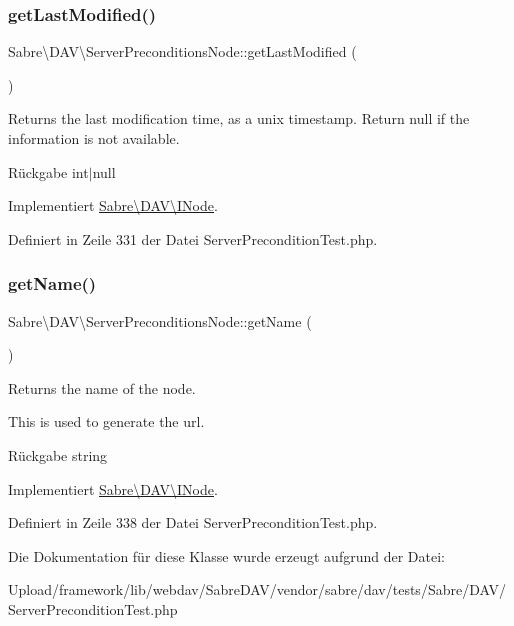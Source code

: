 \subsubsection{\texorpdfstring{get\+Last\+Modified()}{getLastModified()}}
{\footnotesize\ttfamily Sabre\textbackslash{}\+D\+A\+V\textbackslash{}\+Server\+Preconditions\+Node\+::get\+Last\+Modified (\begin{DoxyParamCaption}{ }\end{DoxyParamCaption})}

Returns the last modification time, as a unix timestamp. Return null if the information is not available.

\begin{DoxyReturn}{Rückgabe}
int$\vert$null 
\end{DoxyReturn}


Implementiert \mbox{\hyperlink{interface_sabre_1_1_d_a_v_1_1_i_node_a06335f81c7d4ec2c6d9e327c8ce61014}{Sabre\textbackslash{}\+D\+A\+V\textbackslash{}\+I\+Node}}.



Definiert in Zeile 331 der Datei Server\+Precondition\+Test.\+php.

\mbox{\label{class_sabre_1_1_d_a_v_1_1_server_preconditions_node_a9ce3a4066f4fd316af509df2aea3ca69}} 
\subsubsection{\texorpdfstring{get\+Name()}{getName()}}
{\footnotesize\ttfamily Sabre\textbackslash{}\+D\+A\+V\textbackslash{}\+Server\+Preconditions\+Node\+::get\+Name (\begin{DoxyParamCaption}{ }\end{DoxyParamCaption})}

Returns the name of the node.

This is used to generate the url.

\begin{DoxyReturn}{Rückgabe}
string 
\end{DoxyReturn}


Implementiert \mbox{\hyperlink{interface_sabre_1_1_d_a_v_1_1_i_node_ab616fe836b1ae36af12126a2bc934dce}{Sabre\textbackslash{}\+D\+A\+V\textbackslash{}\+I\+Node}}.



Definiert in Zeile 338 der Datei Server\+Precondition\+Test.\+php.



Die Dokumentation für diese Klasse wurde erzeugt aufgrund der Datei\+:\begin{DoxyCompactItemize}
\item 
Upload/framework/lib/webdav/\+Sabre\+D\+A\+V/vendor/sabre/dav/tests/\+Sabre/\+D\+A\+V/Server\+Precondition\+Test.\+php\end{DoxyCompactItemize}
